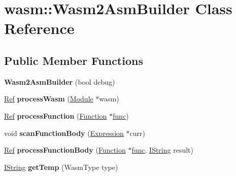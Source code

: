 \hypertarget{classwasm_1_1_wasm2_asm_builder}{}\section{wasm\+:\+:Wasm2\+Asm\+Builder Class Reference}
\label{classwasm_1_1_wasm2_asm_builder}
\subsection*{Public Member Functions}
\begin{DoxyCompactItemize}
\item 
\mbox{\label{classwasm_1_1_wasm2_asm_builder_a9b5dce7453c2b46cedce5fe4099af15d}} 
{\bfseries Wasm2\+Asm\+Builder} (bool debug)
\item 
\mbox{\label{classwasm_1_1_wasm2_asm_builder_a487b71920c400faac26e7e6173d0bca1}} 
\mbox{\hyperlink{structcashew_1_1_ref}{Ref}} {\bfseries process\+Wasm} (\mbox{\hyperlink{classwasm_1_1_module}{Module}} $\ast$wasm)
\item 
\mbox{\label{classwasm_1_1_wasm2_asm_builder_aa7637fe69bdd04a4768a564382faa3af}} 
\mbox{\hyperlink{structcashew_1_1_ref}{Ref}} {\bfseries process\+Function} (\mbox{\hyperlink{classwasm_1_1_function}{Function}} $\ast$\mbox{\hyperlink{structfunc}{func}})
\item 
\mbox{\label{classwasm_1_1_wasm2_asm_builder_ad0962484a5e4ed14b548437a307fdf6b}} 
void {\bfseries scan\+Function\+Body} (\mbox{\hyperlink{classwasm_1_1_expression}{Expression}} $\ast$curr)
\item 
\mbox{\label{classwasm_1_1_wasm2_asm_builder_ae8f148826c0f4190c1743de42d83b2f6}} 
\mbox{\hyperlink{structcashew_1_1_ref}{Ref}} {\bfseries process\+Function\+Body} (\mbox{\hyperlink{classwasm_1_1_function}{Function}} $\ast$\mbox{\hyperlink{structfunc}{func}}, \mbox{\hyperlink{structcashew_1_1_i_string}{I\+String}} result)
\item 
\mbox{\label{classwasm_1_1_wasm2_asm_builder_a91fd0b545d87f2f1494e4c06f427cf04}} 
\mbox{\hyperlink{structcashew_1_1_i_string}{I\+String}} {\bfseries get\+Temp} (Wasm\+Type type)

\end{DoxyCompactItemize}
